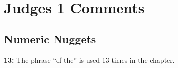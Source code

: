 \section{Judges 1 Comments}

\subsection{Numeric Nuggets}
\textbf{13: } The phrase ``of the'' is used 13 times in the chapter.